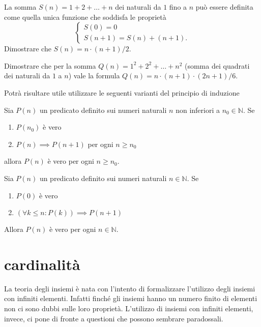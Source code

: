 \documentclass[italian,a4paper,hidelinks,headinclude]{scrartcl}
\newcommand{\NN}{{\mathbb N}}
\begin{document}
\begin{exercise}
La somma $S(n) = 1 + 2 + \dots +n$
dei naturali da $1$ fino a $n$ può essere definita come quella unica funzione
che soddisfa le proprietà
\[
\begin{cases}
  S(0) = 0 \\
  S(n+1) = S(n) + (n+1).
\end{cases}
\]
Dimostrare che $S(n) = n \cdot (n+1) / 2$.
\end{exercise}

\begin{exercise}
Dimostrare che per la somma
$Q(n) = 1^2 + 2^2 + \dots + n^2$
(somma dei quadrati dei naturali da $1$ a $n$)
vale la formula
$Q(n) = n \cdot (n+1)\cdot (2n + 1) / 6$.
\end{exercise}

Potrà risultare utile utilizzare le seguenti varianti del principio di
induzione
\begin{theorem}
Sia $P(n)$ un predicato definito sui numeri naturali $n$
non inferiori a $n_0\in \NN$.
Se
\begin{enumerate}
\item $P(n_0)$ è vero
\item $P(n) \implies P(n+1)$ per ogni $n\ge n_0$
\end{enumerate}
allora $P(n)$ è vero per ogni $n\ge n_0$.
\end{theorem}

\begin{theorem}
Sia $P(n)$ un predicato definito sui numeri naturali $n\in \NN$.
Se
\begin{enumerate}
\item $P(0)$ è vero
\item $(\forall k\le n\colon P(k))\implies P(n+1)$
\end{enumerate}
Allora $P(n)$ è vero per ogni $n\in \NN$.
\end{theorem}



\section{cardinalità}

La teoria degli insiemi è nata con l'intento di formalizzare l'utilizzo degli
insiemi con infiniti elementi. Infatti finché gli insiemi hanno un numero finito
di elementi non ci sono dubbi sulle loro proprietà. L'utilizzo di insiemi con
infiniti elementi, invece, ci pone di fronte a questioni che possono sembrare
paradossali.
\end{document}
